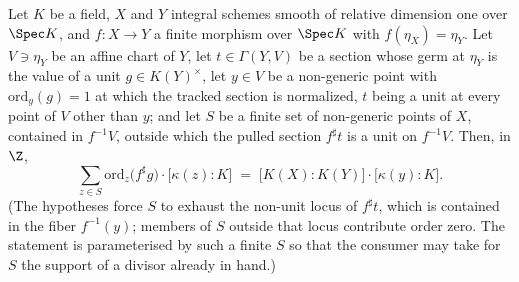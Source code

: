 \begin{theorem}
  \label{thm:sum_ordZ_residueDeg_of_isFinite}
  \leanok
  Let \(K\) be a field, \(X\) and \(Y\) integral schemes smooth of relative dimension
  one over \(\Spec K\), and \(f : X \to Y\) a finite morphism over \(\Spec K\) with
  \(f(\eta_X) = \eta_Y\). Let \(V \ni \eta_Y\) be an affine chart of \(Y\), let
  \(t \in \Gamma(Y, V)\) be a section whose germ at \(\eta_Y\) is the value of a unit
  \(g \in K(Y)^{\times}\), let \(y \in V\) be a non-generic point with
  \(\mathrm{ord}_y(g) = 1\) at which the tracked section is normalized, \(t\) being a
  unit at every point of \(V\) other than \(y\); and let \(S\) be a finite set of
  non-generic points of \(X\), contained in \(f^{-1}V\), outside which the pulled
  section \(f^{\sharp}t\) is a unit on \(f^{-1}V\). Then, in \(\Z\),
  \[
    \sum_{z \in S} \mathrm{ord}_z\bigl(f^{\sharp}g\bigr)
      \cdot \bigl[\kappa(z) : K\bigr]
    \;=\; \bigl[K(X) : K(Y)\bigr] \cdot \bigl[\kappa(y) : K\bigr].
  \]
  (The hypotheses force \(S\) to exhaust the non-unit locus of \(f^{\sharp}t\), which
  is contained in the fiber \(f^{-1}(y)\); members of \(S\) outside that locus
  contribute order zero. The statement is parameterised by such a finite \(S\) so that
  the consumer may take for \(S\) the support of a divisor already in hand.)
\end{theorem}
